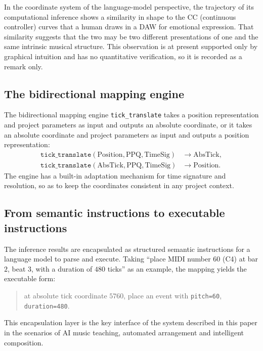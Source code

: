 \documentclass[11pt,a4paper]{article}
\begin{document}
\begin{remark}
In the coordinate system of the language-model perspective, the trajectory of its
computational inference shows a similarity in shape to the CC (continuous controller)
curves that a human draws in a DAW for emotional expression. That similarity suggests
that the two may be two different presentations of one and the same intrinsic musical
structure. This observation is at present supported only by graphical intuition and has
no quantitative verification, so it is recorded as a remark only.
\end{remark}

\subsection{The bidirectional mapping engine}

\begin{definition}
The bidirectional mapping engine \texttt{tick\_translate} takes a position representation
and project parameters as input and outputs an absolute coordinate, or it takes an
absolute coordinate and project parameters as input and outputs a position
representation:
\begin{align}
  \texttt{tick\_translate}(\mathrm{Position}, \mathrm{PPQ}, \mathrm{TimeSig})
    &\to \mathrm{AbsTick}, \label{eq:tt1}\\
  \texttt{tick\_translate}(\mathrm{AbsTick}, \mathrm{PPQ}, \mathrm{TimeSig})
    &\to \mathrm{Position}. \label{eq:tt2}
\end{align}
The engine has a built-in adaptation mechanism for time signature and resolution, so as
to keep the coordinates consistent in any project context.
\end{definition}

\subsection{From semantic instructions to executable instructions}

The inference results are encapsulated as structured semantic instructions for a
language model to parse and execute. Taking ``place MIDI number $60$ (C4) at bar $2$,
beat $3$, with a duration of $480$ ticks'' as an example, the mapping yields the
executable form:
\begin{quote}\small
at absolute tick coordinate $5760$, place an event with \texttt{pitch=60},
\texttt{duration=480}.
\end{quote}
This encapsulation layer is the key interface of the system described in this paper in
the scenarios of AI music teaching, automated arrangement and intelligent composition.
\end{document}
